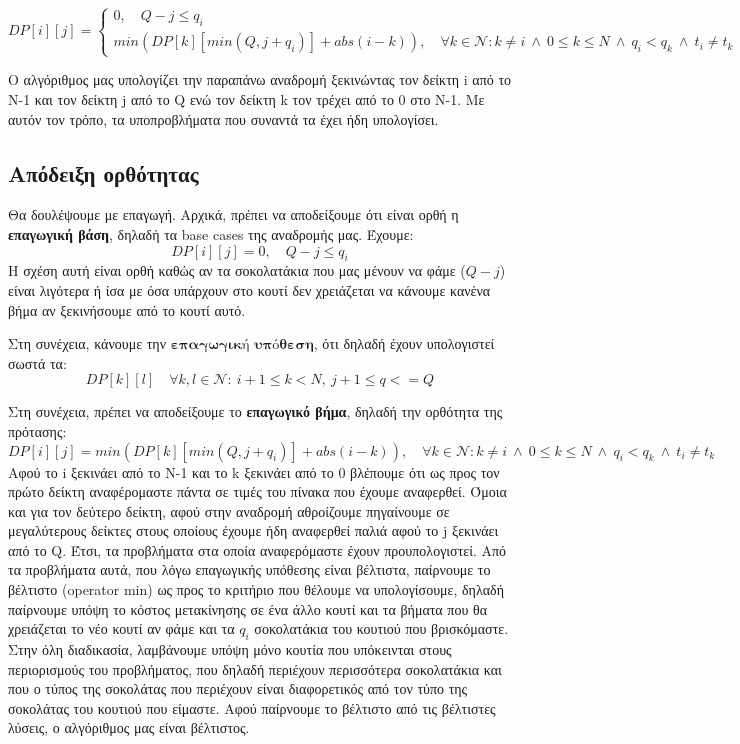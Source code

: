 \documentclass[a4paper,oneside, 11pt]{article}
\begin{document}
$$DP[i][j]= \left\{ \begin{array}{ll}
0, \quad Q - j \leq q_i \\
min\left( DP[k][min(Q, j+q_i)] + abs(i - k)\right), \quad \forall k\in \mathcal{N}: k\neq i \ \wedge \ 0 \leq k \leq N \ \wedge \ q_i < q_k \ \wedge \ t_i \neq t_k

\end{array}
\right.$$

Ο αλγόριθμος μας υπολογίζει την παραπάνω αναδρομή ξεκινώντας τον δείκτη i από το N-1 και τον δείκτη j από το Q ενώ τον δείκτη k τον τρέχει από το 0 στο N-1. Με αυτόν τον τρόπο, τα υποπροβλήματα που συναντά τα έχει ήδη υπολογίσει.
\subsection*{Απόδειξη ορθότητας}
Θα δουλέψουμε με επαγωγή. Αρχικά, πρέπει να αποδείξουμε ότι είναι ορθή η \textbf{επαγωγική βάση}, δηλαδή τα base cases της αναδρομής μας. Έχουμε:
$$DP[i][j] = 0, \quad Q-j\leq q_i$$
Η σχέση αυτή είναι ορθή καθώς αν τα σοκολατάκια που μας μένουν να φάμε ($Q-j$) είναι λιγότερα ή ίσα με όσα υπάρχουν στο κουτί δεν χρειάζεται να κάνουμε κανένα βήμα αν ξεκινήσουμε από το κουτί αυτό. \bigbreak 

Στη συνέχεια, κάνουμε την $\textbf{επαγωγική υπόθεση}$, ότι δηλαδή έχουν υπολογιστεί σωστά τα:
$$DP[k][l] \quad \forall k,l \in \mathcal{N}: \ i+1\leq k < N, \ j+1 \leq q <=Q $$

Στη συνέχεια, πρέπει να αποδείξουμε το \textbf{επαγωγικό βήμα}, δηλαδή την ορθότητα της πρότασης:
$$ DP[i][j] = min\left( DP[k][min(Q, j+q_i)] + abs(i - k)\right), \quad \forall k\in \mathcal{N}: k\neq i \ \wedge \ 0 \leq k \leq N \ \wedge \ q_i < q_k \ \wedge \ t_i \neq t_k$$
Αφού το i ξεκινάει από το N-1 και το k ξεκινάει από το 0 βλέπουμε ότι ως προς τον πρώτο δείκτη αναφέρομαστε πάντα σε τιμές του πίνακα που έχουμε αναφερθεί. Όμοια και για τον δεύτερο δείκτη, αφού στην αναδρομή αθροίζουμε πηγαίνουμε σε μεγαλύτερους δείκτες στους οποίους έχουμε ήδη αναφερθεί παλιά αφού το j ξεκινάει από το Q. Έτσι, τα προβλήματα στα οποία αναφερόμαστε έχουν προυπολογιστεί. Από τα προβλήματα αυτά, που λόγω επαγωγικής υπόθεσης είναι βέλτιστα, παίρνουμε το βέλτιστο (operator min) ως προς το κριτήριο που θέλουμε να υπολογίσουμε, δηλαδή παίρνουμε υπόψη το κόστος μετακίνησης σε ένα άλλο κουτί και τα βήματα που θα χρειάζεται το νέο κουτί αν φάμε και τα $q_i$ σοκολατάκια του κουτιού που βρισκόμαστε. Στην όλη διαδικασία, λαμβάνουμε υπόψη μόνο κουτία που υπόκεινται στους περιορισμούς του προβλήματος, που δηλαδή περιέχουν περισσότερα σοκολατάκια και που ο τύπος της σοκολάτας που περιέχουν είναι διαφορετικός από τον τύπο της σοκολάτας του κουτιού που είμαστε. Αφού παίρνουμε το βέλτιστο από τις βέλτιστες λύσεις, ο αλγόριθμος μας είναι βέλτιστος. \bigbreak 
\end{document}
